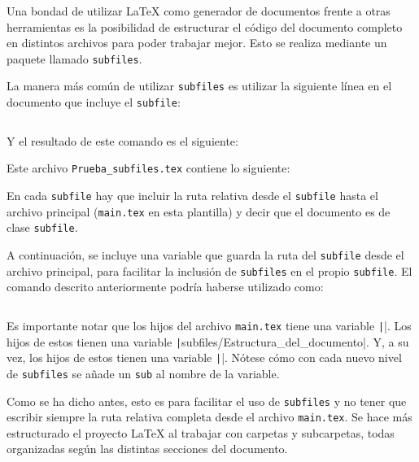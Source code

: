 \documentclass[../../main.tex]{subfile}
\providecommand{\subdirname}{subfiles/Estructura_del_documento}
\begin{document}
  Una bondad de utilizar LaTeX como generador de documentos frente a otras herramientas es la posibilidad de estructurar el código del documento completo en distintos archivos para poder trabajar mejor. Esto se realiza mediante un paquete llamado \texttt{subfiles}.

  La manera más común de utilizar \texttt{subfiles} es utilizar la siguiente línea en el documento que incluye el \texttt{subfile}:

  \begin{verbatim}

  \end{verbatim}

  Y el resultado de este comando es el siguiente:

  

  Este archivo \texttt{Prueba\_subfiles.tex} contiene lo siguiente:


  En cada \texttt{subfile} hay que incluir la ruta relativa desde el \texttt{subfile} hasta el archivo principal (\texttt{main.tex} en esta plantilla) y decir que el documento es de clase \texttt{subfile}.

  A continuación, se incluye una variable que guarda la ruta del \texttt{subfile} desde el archivo principal, para facilitar la inclusión de \texttt{subfiles} en el propio \texttt{subfile}. El comando descrito anteriormente podría haberse utilizado como:

  \begin{verbatim}

  \end{verbatim}

  Es importante notar que los hijos del archivo \texttt{main.tex} tiene una variable \texttt|\dirname|. Los hijos de estos tienen una variable \texttt|\subdirname|. Y, a su vez, los hijos de estos tienen una variable \texttt|\subsubdirname|. Nótese cómo con cada nuevo nivel de \texttt{subfiles} se añade un \texttt{sub} al nombre de la variable.

  Como se ha dicho antes, esto es para facilitar el uso de \texttt{subfiles} y no tener que escribir siempre la ruta relativa completa desde el archivo \texttt{main.tex}. Se hace más estructurado el proyecto LaTeX al trabajar con carpetas y subcarpetas, todas organizadas según las distintas secciones del documento.
\end{document}
